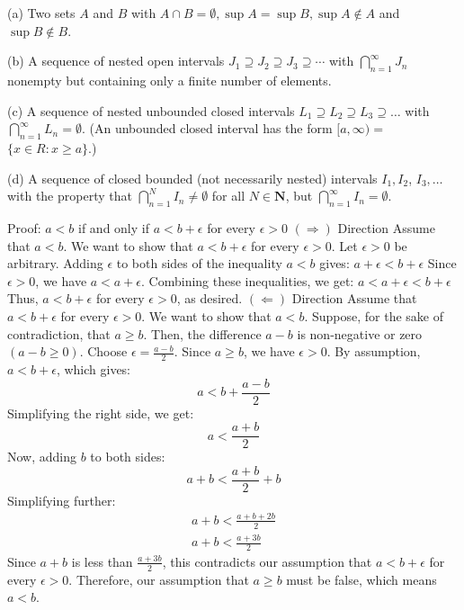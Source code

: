 \documentclass{report}
\begin{document}
(a) Two sets $A$ and $B$ with $A \cap B=\emptyset, \sup A=\sup B, \sup A \notin A$ and $\sup B \notin B$.
\par \bigskip
(b) A sequence of nested open intervals $J_1 \supseteq J_2 \supseteq J_3 \supseteq \cdots$ with $\bigcap_{n=1}^{\infty} J_n$ nonempty but containing only a finite number of elements.
\par \bigskip
(c) A sequence of nested unbounded closed intervals $L_1 \supseteq L_2 \supseteq L_3 \supseteq \ldots$ with $\bigcap_{n=1}^{\infty} L_n=\emptyset$. (An unbounded closed interval has the form $[a, \infty)=$ $\{x \in R: x \geq a\}$.)
\par \bigskip
(d) A sequence of closed bounded (not necessarily nested) intervals $I_1, I_2$, $I_3, \ldots$ with the property that $\bigcap_{n=1}^N I_n \neq \emptyset$ for all $N \in \mathbf{N}$, but $\bigcap_{n=1}^{\infty} I_n=\emptyset$.

Proof: $a<b$ if and only if $a<b+\epsilon$ for every $\epsilon>0$
$(\Rightarrow)$ Direction
Assume that $a<b$. We want to show that $a<b+\epsilon$ for every $\epsilon>0$.
Let $\epsilon>0$ be arbitrary. Adding $\epsilon$ to both sides of the inequality $a<b$ gives: $a+\epsilon<b+\epsilon$
Since $\epsilon>0$, we have $a<a+\epsilon$. Combining these inequalities, we get: $a<a+\epsilon<b+\epsilon$
Thus, $a<b+\epsilon$ for every $\epsilon>0$, as desired.
$(\Leftarrow)$ Direction
Assume that $a<b+\epsilon$ for every $\epsilon>0$. We want to show that $a<b$.
Suppose, for the sake of contradiction, that $a \geq b$. Then, the difference $a-b$ is non-negative or zero $(a-b \geq 0)$.
Choose $\epsilon=\frac{a-b}{2}$. Since $a \geq b$, we have $\epsilon>0$. By assumption, $a<b+\epsilon$, which gives:
$$
a<b+\frac{a-b}{2}
$$
Simplifying the right side, we get:
$$
a<\frac{a+b}{2}
$$
Now, adding $b$ to both sides:
$$
a+b<\frac{a+b}{2}+b
$$
Simplifying further:
$$
\begin{gathered}
a+b<\frac{a+b+2 b}{2} \\
a+b<\frac{a+3 b}{2}
\end{gathered}
$$
Since $a+b$ is less than $\frac{a+3 b}{2}$, this contradicts our assumption that $a<b+\epsilon$ for every $\epsilon>0$. Therefore, our assumption that $a \geq b$ must be false, which means $a<b$.
\end{document}
